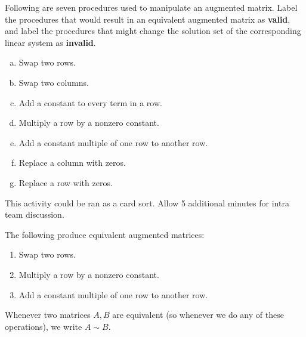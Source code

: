 \begin{applicationActivities}
\begin{activity}{10}
  Following are seven procedures used to manipulate an augmented matrix.
  Label the procedures that would result in an equivalent augmented
  matrix as \textbf{valid}, and label the procedures that might
  change the solution set of the corresponding linear system as
  \textbf{invalid}.
  \begin{multicols}{2}
    \begin{enumerate}[a)]
      \item Swap two rows.
      \item Swap two columns.
      \item Add a constant to every term in a row.
      \item Multiply a row by a nonzero constant. \columnbreak
      \item Add a constant multiple of one row to another row.
      \item Replace a column with zeros.
      \item Replace a row with zeros.
    \end{enumerate}
  \end{multicols}
  \begin{instructorNote}
    This activity could be ran as a card sort.  Allow 5 additional minutes for intra team discussion.
  \end{instructorNote}
\end{activity}


\begin{definition}
  The following  produce equivalent
  augmented matrices:
  \begin{enumerate}
    \item Swap two rows.
    \item Multiply a row by a nonzero constant.
    \item Add a constant multiple of one row to another row.
  \end{enumerate}
  Whenever two matrices \(A,B\) are equivalent (so whenever we do any of
  these operations), we write \(A\sim B\).
\end{definition}


\end{applicationActivities}
